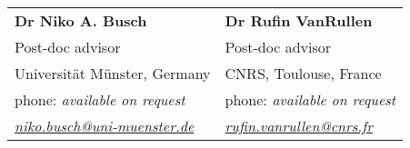 \documentclass[margin,line]{resume}
\begin{document}
\begin{resume}
	\begin{tabular}{@{}p{6cm}p{6cm}}
	\textbf{Dr Niko A. Busch}       &  \textbf{Dr Rufin VanRullen}                   \\
	Post-doc advisor                   &  Post-doc advisor                       \\
	Universität Münster, Germany         &  CNRS, Toulouse, France        \\
	phone: \textsl{available on request}    &  phone: \textsl{available on request}     \\
	\textsl{\href{mailto:niko.busch@uni-muenster.de}{niko.busch@uni-muenster.de}}  &  
	\textsl{\href{mailto:rufin.vanrullen@cnrs.fr}{rufin.vanrullen@cnrs.fr}}    \\
	\end{tabular}
	
\end{resume}
\end{document}
